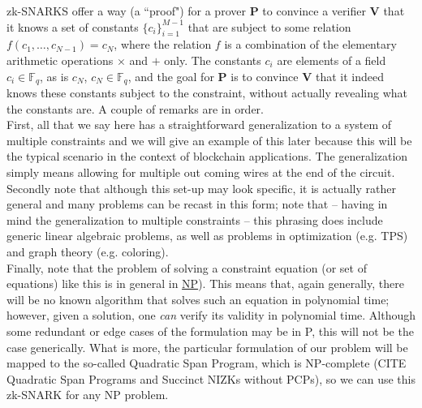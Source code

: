\documentclass[11pt,oneside]{article}
\newcommand{\bP}{\textbf{P} }
\newcommand{\bV}{\textbf{V} }
\theoremstyle{definition}
\theoremstyle{remark}
\numberwithin{equation}{section}
\begin{document}
zk-SNARKS offer a way (a ``proof") for a prover \bP to convince a verifier \bV
that it knows a set of constants $\{c_i\}_{i=1}^{M-1}$ that are subject to some
relation $ f(c_1,\ldots,c_{N-1})=c_N $, where the relation $f$ is a combination
of the elementary arithmetic operations $\times$ and $+$ only. The constants
$c_i$ are elements of a field $c_i\in\mathbb{F}_q$, as is $c_N$,
$c_N\in\mathbb{F}_{q}$, and the goal for \bP is to convince \bV that it indeed
knows these constants subject to the constraint, without actually revealing what
the constants are. A couple of remarks are in order.  \\ First, all that we say
here has a straightforward generalization to a system of multiple constraints
and we will give an example of this later because this will be the typical
scenario in the context of blockchain applications. The generalization simply
means allowing for multiple out coming wires at the end of the circuit.\\
Secondly note that although this set-up may look specific, it is actually rather
general and many problems can be recast in this form; note that -- having in
mind the generalization to multiple constraints -- this phrasing does include
generic linear algebraic problems, as well as problems in optimization (e.g.
TPS) and graph theory (e.g. coloring).\\ Finally, note that the problem of
solving a constraint equation (or set of equations) like this is in general in
\hyperlink{box:np}{NP}). This means that, again generally, there will be no
known algorithm that solves such an equation in polynomial time; however, given
a solution, one \emph{can} verify its validity in polynomial time. Although some
redundant or edge cases of the formulation may be in P, this will not be the
case generically. What is more, the particular formulation of our problem will
be mapped to the so-called Quadratic Span Program, which is NP-complete (CITE
Quadratic Span Programs and Succinct NIZKs without PCPs), so we can use this
zk-SNARK for any NP problem.  \newline
\end{document}
